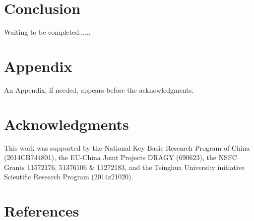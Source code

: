 \documentclass{AIAA}
\begin{document}
\section{Conclusion}
Waiting to be completed......

\section*{Appendix}

An Appendix, if needed, appears before the acknowledgments.


\clearpage %
\section*{Acknowledgments}
This work was supported by the National Key Basic Research Program of China (2014CB744801), the EU-China Joint Projects DRAGY (690623), the NSFC Grants 11572176, 51376106 \& 11272183, and the Tsinghua University initiative Scientific Research Program (2014z21020).

\section*{References}


\end{document}
